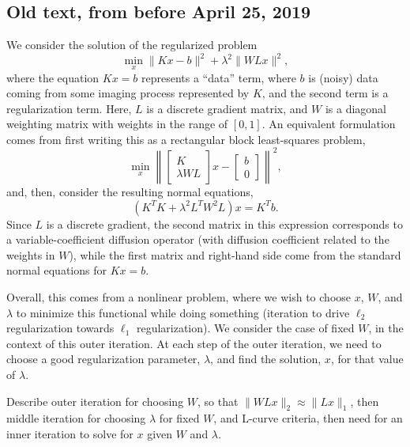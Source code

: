 \subsection{Old text, from before April 25, 2019}
We consider the solution of the regularized problem
\begin{equation}
\label{eq:regularized_old}
\min_{x} \|Kx-b\|^2 + \lambda^2\|WLx\|^2,
\end{equation}
where the equation $Kx=b$ represents a ``data'' term, where $b$ is
(noisy) data coming from some imaging process represented by $K$, and
the second term is a regularization term.  Here, $L$ is a discrete
gradient matrix, and $W$ is a diagonal weighting matrix with weights
in the range of $[0,1]$.  An equivalent formulation comes from first
writing this as a rectangular block least-squares problem,
\begin{equation}
  \label{eq:block-ls}
  \min_{x} \left\| \left[\begin{array}{c} K \\ \lambda
                           WL\end{array}\right]x - \left[\begin{array}{c} b \\ 0 \end{array}\right]\right\|^2,
\end{equation}
and, then, consider the resulting normal equations,
\begin{equation}
\label{eq:normal}
\left(K^TK + \lambda^2 L^TW^2L\right)x = K^Tb.
\end{equation}
Since $L$ is a discrete gradient, the second matrix in this expression
corresponds to a variable-coefficient diffusion operator (with
diffusion coefficient related to the weights in $W$), while the first
matrix and right-hand side come from the standard normal equations for
$Kx=b$.

Overall, this comes from a nonlinear problem, where we wish to choose
$x$, $W$, and $\lambda$ to minimize this functional while doing
something (iteration to drive $\ell_2$ regularization towards $\ell_1$
regularization).  We consider the case of fixed $W$, in the context of
this outer iteration.  At each step of the outer iteration, we need to
choose a good regularization parameter, $\lambda$, and find the
solution, $x$, for that value of $\lambda$.

Describe outer iteration for choosing $W$, so that $\|WLx\|_2 \approx
\|Lx\|_1$, then middle iteration for choosing $\lambda$ for fixed $W$,
and L-curve criteria, then need for an inner iteration to solve for
$x$ given $W$ and $\lambda$.
